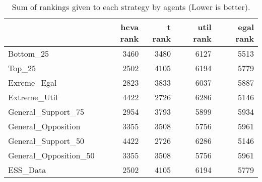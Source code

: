 \begin{table}
\caption{Sum of rankings given to each strategy by agents (Lower is better).}
\begin{tabular}{lrrrr}
\toprule
 & hcva rank & t rank & util rank & egal rank \\
\midrule
Bottom_25 & 3460 & 3480 & 6127 & 5513 \\
Top_25 & 2502 & 4105 & 6194 & 5779 \\
Exreme_Egal & 2823 & 3833 & 6037 & 5887 \\
Extreme_Util & 4422 & 2726 & 6286 & 5146 \\
General_Support_75 & 2954 & 3793 & 5899 & 5934 \\
General_Opposition & 3355 & 3508 & 5756 & 5961 \\
General_Support_50 & 4422 & 2726 & 6286 & 5146 \\
General_Opposition_50 & 3355 & 3508 & 5756 & 5961 \\
ESS_Data & 2502 & 4105 & 6194 & 5779 \\
\bottomrule
\end{tabular}
\end{table}
